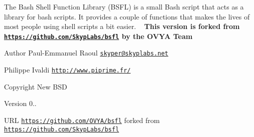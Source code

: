 The Bash Shell Function Library (B\+S\+FL) is a small Bash script that acts as a library for bash scripts. It provides a couple of functions that makes the lives of most people using shell scripts a bit easier. ~\newline
{\bfseries This version is forked from \href{https://github.com/SkypLabs/bsfl}{\tt https\+://github.\+com/\+Skyp\+Labs/bsfl} by the O\+V\+YA Team} 
\begin{DoxyCodeInclude}

\end{DoxyCodeInclude}
 \begin{DoxyAuthor}{Author}
Paul-\/\+Emmanuel Raoul \href{mailto:skyper@skyplabs.net}{\tt skyper@skyplabs.\+net} 

Philippe Ivaldi \href{http://www.piprime.fr/}{\tt http\+://www.\+piprime.\+fr/} 
\end{DoxyAuthor}
\begin{DoxyCopyright}{Copyright}
New B\+SD 
\end{DoxyCopyright}
\begin{DoxyVersion}{Version}
0.. 
\end{DoxyVersion}
\begin{DoxyParagraph}{U\+RL}
\href{https://github.com/OVYA/bsfl}{\tt https\+://github.\+com/\+O\+V\+Y\+A/bsfl} forked from \href{https://github.com/SkypLabs/bsfl}{\tt https\+://github.\+com/\+Skyp\+Labs/bsfl} 
\end{DoxyParagraph}
